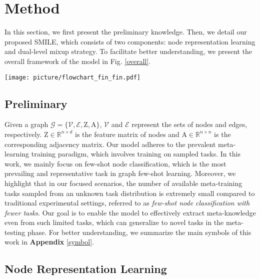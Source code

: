 \section{Method}
In this section, we first present the preliminary knowledge. Then, we detail our proposed SMILE, which consists of two components: node representation learning and dual-level mixup strategy. To facilitate better understanding, we present the overall framework of the model in Fig. \ref{overall}.
\begin{figure*}
    \centering
    \texttt{[image: picture/flowchart\_fin\_fin.pdf]}
    \caption{The overall architecture of SMILE.}
    \label{overall}
\end{figure*}

\subsection{Preliminary}
Given a graph $\mathcal{G}\!=\!\{\mathcal{V},\mathcal{E},\mathrm{Z},\mathrm{A}\}$, $\mathcal{V}$ and $\mathcal{E}$ represent the sets of nodes and edges, respectively. $\mathrm{Z}\!\in\!\mathbb R^{n\times d}$ is the feature matrix of nodes and $\mathrm{A}\!\in\!\mathbb R^{n\times n}$ is the corresponding adjacency matrix. Our model adheres to the prevalent meta-learning training paradigm, which involves training on sampled tasks. In this work, we mainly focus on few-shot node classification, which is the most prevailing and representative task in graph few-shot learning. Moreover, we highlight that in our focused scenarios, the number of available meta-training tasks sampled from an unknown task distribution is extremely small compared to traditional experimental settings, referred to as \textit{few-shot node classification with fewer tasks}. Our goal is to enable the model to effectively extract meta-knowledge even from such limited tasks, which can generalize to novel tasks in the meta-testing phase. For better understanding, we summarize the main symbols of this work in \textbf{Appendix} \ref{symbol}.


\subsection{Node Representation Learning}

